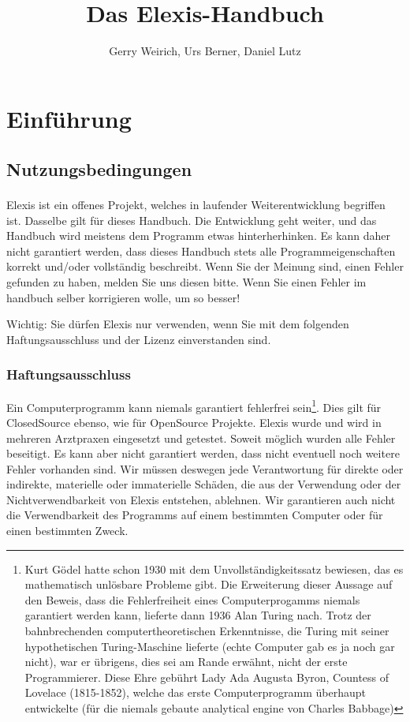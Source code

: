 \documentclass[paper=a4,BCOR8.25mm,twoside]{scrbook}
\author{Gerry Weirich, Urs Berner, Daniel Lutz}
\title{Das Elexis\textsuperscript{\textregistered}-Handbuch}
\begin{document}
\maketitle

\tableofcontents

\part{Einführung}
\chapter{Nutzungsbedingungen}
Elexis\textsuperscript{\textregistered} ist ein offenes Projekt, welches in laufender Weiterentwicklung begriffen ist. Dasselbe gilt für dieses Handbuch.
Die Entwicklung geht weiter, und das Handbuch wird meistens dem Programm etwas hinterherhinken. Es kann daher nicht garantiert werden, dass dieses Handbuch stets alle Programmeigenschaften korrekt und/oder vollständig beschreibt. Wenn Sie der Meinung sind, einen Fehler gefunden zu haben, melden Sie uns diesen bitte. Wenn Sie einen Fehler im handbuch selber korrigieren wolle, um so besser!

Wichtig: Sie dürfen Elexis nur verwenden, wenn Sie mit dem folgenden Haftungsausschluss und der Lizenz einverstanden sind.

\section{Haftungsausschluss}
Ein Computerprogramm kann niemals garantiert fehlerfrei sein\footnote{Kurt Gödel hatte schon 1930 mit dem Unvollständigkeitssatz bewiesen, das es mathematisch unlösbare Probleme gibt. Die Erweiterung dieser Aussage auf den Beweis, dass die Fehlerfreiheit eines Computerprogamms niemals garantiert werden kann, lieferte dann 1936 Alan Turing nach. Trotz der bahnbrechenden computertheoretischen Erkenntnisse, die Turing mit seiner hypothetischen Turing-Maschine lieferte (echte Computer gab es ja noch gar nicht), war er übrigens, dies sei am Rande erwähnt, nicht der erste Programmierer. Diese Ehre gebührt Lady Ada Augusta Byron, Countess of Lovelace (1815-1852), welche das erste Computerprogramm überhaupt entwickelte (für die niemals gebaute analytical engine von Charles Babbage)}. Dies gilt für ClosedSource ebenso, wie für OpenSource Projekte. Elexis wurde und wird in mehreren Arztpraxen eingesetzt und getestet. Soweit möglich wurden alle Fehler beseitigt. Es kann aber nicht garantiert werden, dass nicht eventuell noch weitere Fehler vorhanden sind. Wir müssen deswegen jede Verantwortung für direkte oder indirekte, materielle oder immaterielle Schäden, die aus der Verwendung oder der Nichtverwendbarkeit von Elexis entstehen, ablehnen. Wir garantieren auch nicht die Verwendbarkeit des Programms auf einem bestimmten Computer oder für einen bestimmten Zweck.
\end{document}
